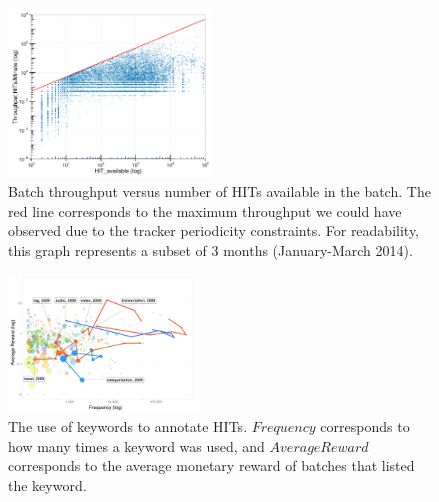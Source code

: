 \begin{figure}[tb]
	\centering
		\includegraphics[width=0.48\textwidth]{figures/motiv_mturk}
	\caption{Batch throughput versus number of HITs available in the batch. The red line corresponds to the maximum throughput we could have observed due to the tracker periodicity constraints. For readability, this graph represents a subset of 3 months (January-March 2014).}
	\label{fig:motiv}
\end{figure}
\begin{figure}[tb]
	\centering
		\includegraphics[width=0.45\textwidth]{figures/tagEvolution}
	\caption{The use of keywords to annotate HITs. $Frequency$ corresponds to how many times a keyword was used, and $Average Reward$ corresponds to the average monetary reward of batches that listed the keyword.}
	\label{fig:tagEvolution}
\end{figure}
